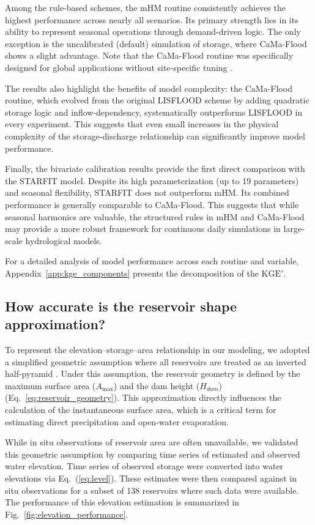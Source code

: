 \documentclass[hess, manuscript]{copernicus}
\newcommand{\KGEmod}{$\text{KGE}'$}
\begin{document}
Among the rule-based schemes, the mHM routine consistently achieves the highest performance across nearly all scenarios. Its primary strength lies in its ability to represent seasonal operations through demand-driven logic. The only exception is the uncalibrated (default) simulation of storage, where CaMa-Flood shows a slight advantage. Note that the CaMa-Flood routine was specifically designed for global applications without site-specific tuning \citep{Hanazaki2022}.

The results also highlight the benefits of model complexity: the CaMa-Flood routine, which evolved from the original LISFLOOD scheme by adding quadratic storage logic and inflow-dependency, systematically outperforms LISFLOOD in every experiment. This suggests that even small increases in the physical complexity of the storage-discharge relationship can significantly improve model performance.

Finally, the bivariate calibration results provide the first direct comparison with the STARFIT model. Despite its high parameterization (up to 19 parameters) and seasonal flexibility, STARFIT does not outperform mHM. Its combined performance is generally comparable to CaMa-Flood. This suggests that while seasonal harmonics are valuable, the structured rules in mHM and CaMa-Flood may provide a more robust framework for continuous daily simulations in large-scale hydrological models.

For a detailed analysis of model performance across each routine and variable, Appendix~\ref{app:kge_components} presents the decomposition of the \KGEmod.

\subsection{How accurate is the reservoir shape approximation?}
\label{sec:reservoir_shape}

To represent the elevation–storage–area relationship in our modeling, we adopted a simplified geometric assumption where all reservoirs are treated as an inverted half-pyramid \citep{Liebe2005}. Under this assumption, the reservoir geometry is defined by the maximum surface area ($A_{\max}$) and the dam height ($H_{dam}$) (Eq.~\ref{eq:reservoir_geometry}). This approximation directly influences the calculation of the instantaneous surface area, which is a critical term for estimating direct precipitation and open-water evaporation.

While in situ observations of reservoir area are often unavailable, we validated this geometric assumption by comparing time series of estimated and observed water elevation. Time series of observed storage were converted into water elevations via Eq.~(\ref{eq:level}). These estimates were then compared against in situ observations for a subset of 138 reservoirs where such data were available. The performance of this elevation estimation is summarized in Fig.~\ref{fig:elevation_performance}.
\end{document}
